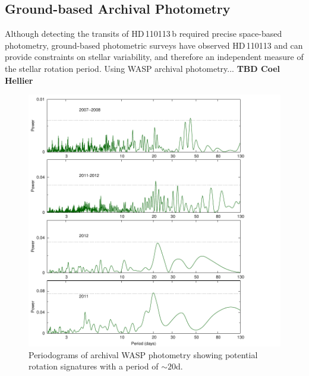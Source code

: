 \documentclass[fleqn,usenatbib]{mnras}
\newcommand{\Tstar}{HD\,110113}
\newcommand{\Tplanet}{HD\,110113\,b}
\begin{document}
\subsection{Ground-based Archival Photometry}
Although detecting the transits of \Tplanet{} required precise space-based photometry, ground-based photometric surveys have observed \Tstar{} and can provide constraints on stellar variability, and therefore an independent measure of the stellar rotation period.
Using WASP archival photometry... \textbf{TBD Coel Hellier}
\begin{figure}
    \centering
    \includegraphics[width=\columnwidth, trim={0 0.8cm 1.8cm 0.1cm}]{toi755_wasp}
    \caption{Periodograms of archival WASP photometry showing potential rotation signatures with a period of $\sim 20$d.}
    \label{fig:wasp}
\end{figure}
\end{document}
